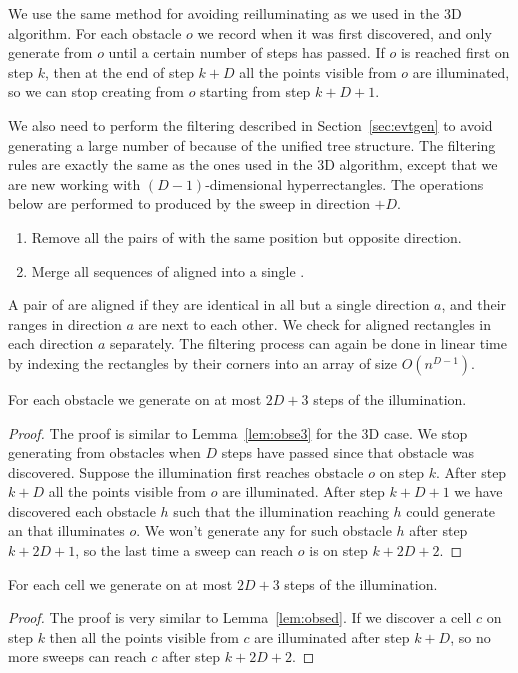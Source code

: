 \documentclass[english,gradu]{tktltiki2018}
\begin{document}
We use the same method for avoiding reilluminating as we used in the 3D algorithm.
For each obstacle $o$ we record when it was first discovered, and only generate \addEs from $o$ until a certain number of steps has passed.
If $o$ is reached first on step $k$, then at the end of step $k+D$ all the points visible from $o$ are illuminated, so we can stop creating \addEs from $o$ starting from step $k+D+1$.

We also need to perform the filtering described in Section~\ref{sec:evtgen} to avoid generating a large number of \addEs because of the unified tree structure.
The filtering rules are exactly the same as the ones used in the 3D algorithm, except that we are new working with $(D-1)$-dimensional hyperrectangles.
The operations below are performed to \addEs produced by the sweep in direction $+D$.
\begin{enumerate}
\item Remove all the pairs of \addEs with the same position but opposite direction.
\item Merge all sequences of aligned \addEs into a single \addE.
\end{enumerate}

A pair of \addEs are aligned if they are identical in all but a single direction $a$, and their ranges in direction $a$ are next to each other.
We check for aligned rectangles in each direction $a$ separately.
The filtering process can again be done in linear time by indexing the rectangles by their corners into an array of size $O(n^{D-1})$.

\begin{lem}\label{lem:obsed}For each obstacle we generate \obsE on at most $2D+3$ steps of the illumination.\end{lem}
\begin{proof}
The proof is similar to Lemma~\ref{lem:obse3} for the 3D case.
We stop generating \addEs from obstacles when $D$ steps have passed since that obstacle was discovered.
Suppose the illumination first reaches obstacle $o$ on step $k$.
After step $k+D$ all the points visible from $o$ are illuminated.
After step $k+D+1$ we have discovered each obstacle $h$ such that the illumination reaching $h$ could generate an \addE that illuminates $o$.
We won't generate any \addEs for such obstacle $h$ after step $k+2D+1$, so the last time a sweep can reach $o$ is on step $k+2D+2$.
\end{proof}

\begin{lem}\label{lem:celled}For each cell we generate \cellE on at most $2D+3$ steps of the illumination.\end{lem}
\begin{proof}
The proof is very similar to Lemma~\ref{lem:obsed}.
If we discover a cell $c$ on step $k$ then all the points visible from $c$ are illuminated after step $k+D$, so no more sweeps can reach $c$ after step $k+2D+2$.
\end{proof}
\end{document}
